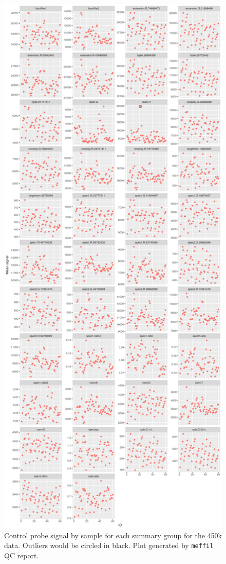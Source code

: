 \documentclass[
]{book}
\begin{document}
\begin{figure}

{\centering \includegraphics[width=0.8\linewidth]{figs/MAVIDOSqc450kctrlProbes} 

}

\caption{Control probe signal by sample for each summary group for the 450k data. Outliers would be circled in black. Plot generated by \texttt{meffil} QC report.}\label{fig:MAVIDOSqc450kctrlProbes}
\end{figure}
\end{document}
